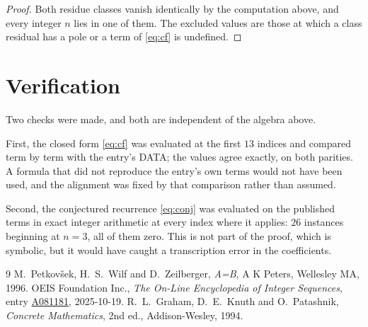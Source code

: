 \documentclass[11pt,a4paper]{article}
\theoremstyle{plain}
\theoremstyle{definition}
\begin{document}
\begin{proof}
Both residue classes vanish identically by the computation above, and every integer $n$
lies in one of them. The excluded values are those at which a class residual has a pole or
a term of \eqref{eq:cf} is undefined.
\end{proof}

\section{Verification}

Two checks were made, and both are independent of the algebra above.

First, the closed form \eqref{eq:cf} was evaluated at the first $13$ indices and
compared term by term with the entry's DATA; the values agree exactly, on both parities. A
formula that did not reproduce the entry's own terms would not have been used, and the
alignment was fixed by that comparison rather than assumed.

Second, the conjectured recurrence \eqref{eq:conj} was evaluated on the published terms in
exact integer arithmetic at every index where it applies: $26$ instances beginning at
$n=3$, all of them zero. This is not part of the proof, which is symbolic, but it
would have caught a transcription error in the coefficients.

\begin{thebibliography}{9}
 M.~Petkov\v{s}ek, H.~S.~Wilf and D.~Zeilberger, \emph{A=B}, A K Peters,
Wellesley MA, 1996.
 OEIS Foundation Inc., \emph{The On-Line Encyclopedia of Integer Sequences},
entry \href{https://oeis.org/A081181}{A081181}, 2025-10-19.
 R.~L.~Graham, D.~E.~Knuth and O.~Patashnik, \emph{Concrete Mathematics},
2nd ed., Addison-Wesley, 1994.
\end{thebibliography}
\end{document}
